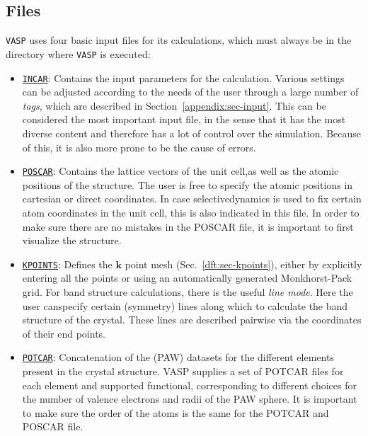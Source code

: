 \begin{refsection}
\subsection{Files} \label{appendix:sec-files}
 
\texttt{VASP} uses four basic input files for its calculations, which 
must always be in the directory where \texttt{VASP} is executed:
 
\begin{itemize} 
 
 \label{appendix:sec-INCAR} 
\item \href{https://www.vasp.at/wiki/index.php/INCAR}{\texttt{INCAR}}: 
Contains the input parameters for the calculation. Various settings can be 
adjusted according to the needs of the user through a large number of 
\textit{tags}, which are described in Section~\ref{appendix:sec-input}. This 
can be considered the most important input file, in the sense that it has 
the most diverse content and therefore has a lot of control over the 
simulation. Because of this, it is also more prone to be the cause of errors. 
 
 \label{appendix:sec-POSCAR} 
\item \href{https://www.vasp.at/wiki/index.php/POSCAR}{\texttt{POSCAR}}: 
Contains the lattice vectors of the unit cell,as well as the atomic positions 
of the structure. The user is free to specify the atomic positions in cartesian 
or direct coordinates. In case selectivedynamics is used to fix certain atom 
coordinates in the unit cell, this is also indicated in this file. In order to 
make sure there are no mistakes in the POSCAR file, it is important to first 
visualize the structure.  
 
 \label{appendix:sec-KPOINTS} 
\item \href{https://www.vasp.at/wiki/index.php/KPOINTS}{\texttt{KPOINTS}}: 
Defines the $\mathbf{k}$ point mesh (Sec.~\ref{dft:sec-kpoints}), either by 
explicitly entering all the points or using an automatically generated 
Monkhorst-Pack grid. For band structure calculations, there is the useful 
\textit{line mode}. Here the user canspecify certain (symmetry) lines along 
which to calculate the band structure of the crystal. These lines are described 
pairwise via the coordinates of their end points.
 
 \label{appendix:sec-POTCAR} 
\item \href{https://www.vasp.at/wiki/index.php/POTCAR}{\texttt{POTCAR}}: 
Concatenation of the  (PAW) 
datasets for the different elements present in the crystal structure. VASP 
supplies a set of POTCAR files for each element and supported functional, 
corresponding to different choices for the number of valence electrons and 
radii of the PAW sphere. It is important to make sure the order of the atoms 
is the same for the POTCAR and POSCAR file. 


\end{itemize}
\end{refsection}
